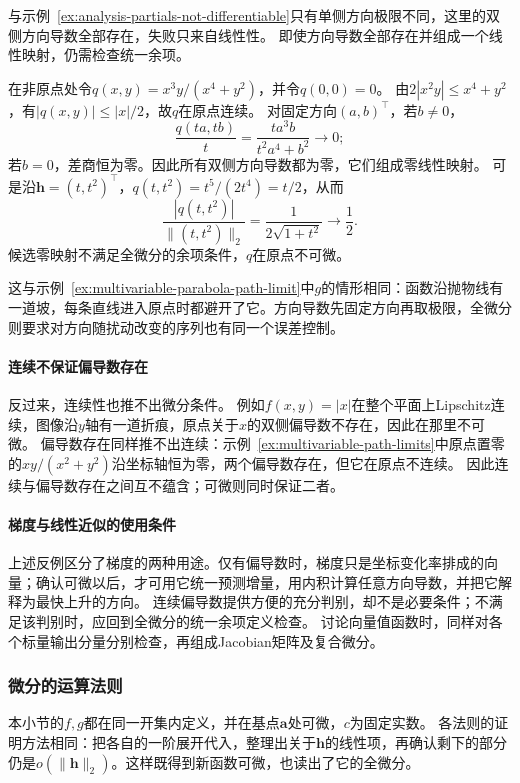 与示例~\ref{ex:analysis-partials-not-differentiable}只有单侧方向极限不同，这里的双侧方向导数全部存在，失败只来自线性性。
即使方向导数全部存在并组成一个线性映射，仍需检查统一余项。
\begin{example}[所有方向导数为零仍不足以可微]
\label{ex:multivariable-linear-directionals-not-differentiable}
在非原点处令$q(x,y)=x^3y/(x^4+y^2)$，并令$q(0,0)=0$。
由$2|x^2y|\leq x^4+y^2$，有$|q(x,y)|\leq|x|/2$，故$q$在原点连续。
对固定方向$(a,b)^\top$，若$b\neq0$，
\[
 \frac{q(ta,tb)}t=\frac{t a^3b}{t^2a^4+b^2}\longrightarrow0;
\]
若$b=0$，差商恒为零。因此所有双侧方向导数都为零，它们组成零线性映射。
可是沿$\bm h=(t,t^2)^\top$，$q(t,t^2)=t^5/(2t^4)=t/2$，从而
\[
 \frac{|q(t,t^2)|}{\lVert(t,t^2)\rVert_2}
 =\frac1{2\sqrt{1+t^2}}\longrightarrow\frac12.
\]
候选零映射不满足全微分的余项条件，$q$在原点不可微。
\end{example}

这与示例~\ref{ex:multivariable-parabola-path-limit}中$g$的情形相同：函数沿抛物线有一道坡，每条直线进入原点时都避开了它。方向导数先固定方向再取极限，全微分则要求对方向随扰动改变的序列也有同一个误差控制。

\paragraph{连续不保证偏导数存在}
反过来，连续性也推不出微分条件。
例如$f(x,y)=|x|$在整个平面上Lipschitz连续，图像沿$y$轴有一道折痕，原点关于$x$的双侧偏导数不存在，因此在那里不可微。
偏导数存在同样推不出连续：示例~\ref{ex:multivariable-path-limits}中原点置零的$xy/(x^2+y^2)$沿坐标轴恒为零，两个偏导数存在，但它在原点不连续。
因此连续与偏导数存在之间互不蕴含；可微则同时保证二者。

\paragraph{梯度与线性近似的使用条件}
上述反例区分了梯度的两种用途。仅有偏导数时，梯度只是坐标变化率排成的向量；确认可微以后，才可用它统一预测增量，用内积计算任意方向导数，并把它解释为最快上升的方向。
连续偏导数提供方便的充分判别，却不是必要条件；不满足该判别时，应回到全微分的统一余项定义检查。
讨论向量值函数时，同样对各个标量输出分量分别检查，再组成Jacobian矩阵及复合微分。

\subsubsection{微分的运算法则}

本小节的$f,g$都在同一开集内定义，并在基点$\bm a$处可微，$c$为固定实数。
各法则的证明方法相同：把各自的一阶展开代入，整理出关于$\bm h$的线性项，再确认剩下的部分仍是$o(\lVert\bm h\rVert_2)$。这样既得到新函数可微，也读出了它的全微分。

